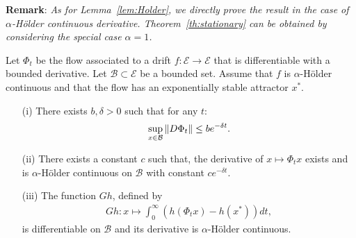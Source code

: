 \documentclass[acmlarge]{acmart}
\newcommand\E{\mathcal{E}}
\newcommand\calB{\mathcal{B}}
\newcommand\norm[1]{{\mathchoice{\bnorm{#1}}{\snorm{#1}}{\snorm{#1}}{\snorm{#1}}}}
\newcommand\bnorm[1]{\left\|#1\right\|}
\newcommand\snorm[1]{\|#1\|}
\newcommand\p[1]{\left(#1\right)}
\begin{document}
\textbf{Remark}: \emph{As for Lemma~\ref{lem:Holder}, we directly
  prove the result in the case of $\alpha$-Hölder continuous
  derivative.  Theorem~\ref{th:stationary} can be obtained by
  considering the special case $\alpha=1$. } \medskip

\begin{lemma}
  \label{lem:proof_ss} 
  Let $\Phi_t$ be the flow associated to a drift $f:\E\to\E$ that is
  differentiable with a bounded derivative. Let $\calB\subset\E$ be a
  bounded set. Assume that $f$ is $\alpha$-Hölder continuous and that
  the flow has an exponentially stable attractor $x^*$.
  \begin{itemize}
  \item[(i)] There exists $b,\delta>0$ such that for any $t$:
    \begin{align*}
      \sup_{x\in\calB}\norm{D\Phi_t}\le be^{-\delta t}. 
    \end{align*}
  \item[(ii)] There exists a constant $c$ such that, the derivative of
    $x\mapsto\Phi_tx$ exists and is $\alpha$-Hölder continuous on
    $\calB$ with constant $ce^{-\delta t}$.
  \item[(iii)] The function $Gh$, defined by 
    \begin{align*}
      Gh : x\mapsto \int_0^\infty \p{h(\Phi_t x)-h(x^*)}dt, 
    \end{align*}
    is differentiable on $\calB$ and its derivative is $\alpha$-Hölder
    continuous.
  \end{itemize}
\end{lemma}
\end{document}
